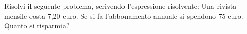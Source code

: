 \item Risolvi il seguente problema, scrivendo l'espressione risolvente: Una rivista mensile costa 7,20 euro. Se si fa l'abbonamento annuale si spendono 75 euro. Quanto si risparmia?